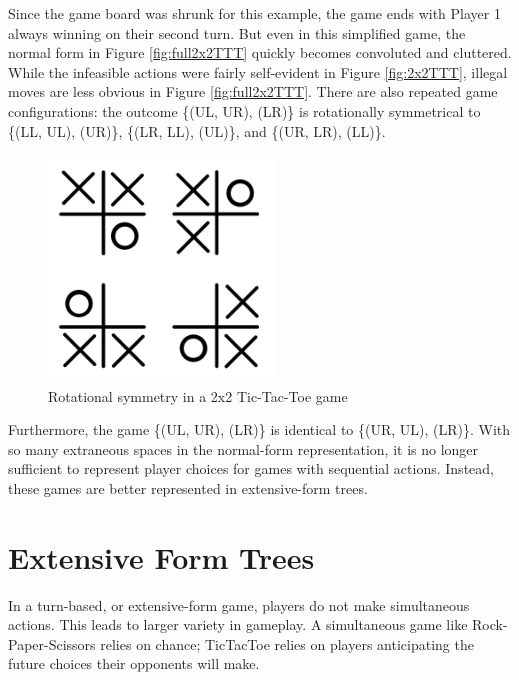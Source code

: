 Since the game board was shrunk for this example, the game ends with Player 1 always winning on their second turn. But even in this simplified game, the normal form in Figure \ref{fig:full2x2TTT} quickly becomes convoluted and cluttered. While the infeasible actions were fairly self-evident in Figure \ref{fig:2x2TTT}, illegal moves are less obvious in Figure \ref{fig:full2x2TTT}. There are also repeated game configurations: the outcome \{(UL, UR), (LR)\} is rotationally symmetrical to \{(LL, UL), (UR)\}, \{(LR, LL), (UL)\}, and \{(UR, LR), (LL)\}.
\begin{figure}[H]
  \centering
  \includegraphics[width=6cm]{figures/TTTRotation.png}
  \caption{Rotational symmetry in a 2x2 Tic-Tac-Toe game}
  \label{fig:2x2TTTRotation}
\end{figure}
Furthermore, the game \{(UL, UR), (LR)\} is identical to \{(UR, UL), (LR)\}. With so many extraneous spaces in the normal-form representation, it is no longer sufficient to represent player choices for games with sequential actions. Instead, these games are better represented in extensive-form trees.\\

\section{Extensive Form Trees}
In a turn-based, or extensive-form game, players do not make simultaneous actions. This leads to larger variety in gameplay. A simultaneous game like Rock-Paper-Scissors relies on chance; TicTacToe relies on players anticipating the future choices their opponents will make.\\

